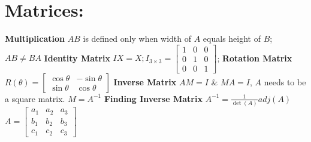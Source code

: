 \documentclass[twoside]{article}
\begin{document}
\section{Matrices:}
\textbf{Multiplication}\newline
\indent $AB$ is defined only when width of $A$ equals height of $B$; $AB \neq BA$ \newline
\textbf{Identity Matrix}
\indent $IX=X; I_{3\times3} = \begin{bmatrix}1&0&0\\0&1&0\\0&0&1\end{bmatrix}$;
\textbf{Rotation Matrix}
\indent $R(\theta) = \begin{bmatrix}\cos\theta & -\sin\theta\\ \sin\theta & \cos\theta \end{bmatrix}$\newline
\textbf{Inverse Matrix}\newline
\indent $AM=I$ \& $MA=I$, $A$ needs to be a square matrix. $M = A^{-1}$\newline
\textbf{Finding Inverse Matrix}\newline
\indent $A^{-1}=\frac{1}{\det(A)} adj(A)$
\indent $A = \begin{bmatrix} a_1 & a_2 & a_3 \\ b_1 & b_2 & b_3 \\ c_1 & c_2 & c_3 \end{bmatrix}$ \newline
\end{document}
